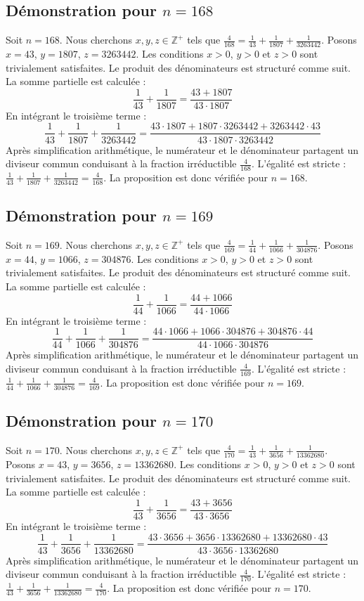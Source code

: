\documentclass[11pt,a4paper]{article}
\begin{document}
\subsection{Démonstration pour $n = 168$}
Soit $n = 168$. Nous cherchons $x, y, z \in \mathbb{Z}^{+}$ tels que $\frac{4}{168} = \frac{1}{43} + \frac{1}{1807} + \frac{1}{3263442}$.
Posons $x = 43$, $y = 1807$, $z = 3263442$.
Les conditions $x > 0$, $y > 0$ et $z > 0$ sont trivialement satisfaites.
Le produit des dénominateurs est structuré comme suit. La somme partielle est calculée :
$$ \frac{1}{43} + \frac{1}{1807} = \frac{43+1807}{43 \cdot 1807} $$
En intégrant le troisième terme :
$$ \frac{1}{43} + \frac{1}{1807} + \frac{1}{3263442} = \frac{43 \cdot 1807 + 1807 \cdot 3263442 + 3263442 \cdot 43}{43 \cdot 1807 \cdot 3263442} $$
Après simplification arithmétique, le numérateur et le dénominateur partagent un diviseur commun conduisant à la fraction irréductible $\frac{4}{168}$.
L'égalité est stricte : $\frac{1}{43} + \frac{1}{1807} + \frac{1}{3263442} = \frac{4}{168}$.
La proposition est donc vérifiée pour $n = 168$.
\subsection{Démonstration pour $n = 169$}
Soit $n = 169$. Nous cherchons $x, y, z \in \mathbb{Z}^{+}$ tels que $\frac{4}{169} = \frac{1}{44} + \frac{1}{1066} + \frac{1}{304876}$.
Posons $x = 44$, $y = 1066$, $z = 304876$.
Les conditions $x > 0$, $y > 0$ et $z > 0$ sont trivialement satisfaites.
Le produit des dénominateurs est structuré comme suit. La somme partielle est calculée :
$$ \frac{1}{44} + \frac{1}{1066} = \frac{44+1066}{44 \cdot 1066} $$
En intégrant le troisième terme :
$$ \frac{1}{44} + \frac{1}{1066} + \frac{1}{304876} = \frac{44 \cdot 1066 + 1066 \cdot 304876 + 304876 \cdot 44}{44 \cdot 1066 \cdot 304876} $$
Après simplification arithmétique, le numérateur et le dénominateur partagent un diviseur commun conduisant à la fraction irréductible $\frac{4}{169}$.
L'égalité est stricte : $\frac{1}{44} + \frac{1}{1066} + \frac{1}{304876} = \frac{4}{169}$.
La proposition est donc vérifiée pour $n = 169$.
\subsection{Démonstration pour $n = 170$}
Soit $n = 170$. Nous cherchons $x, y, z \in \mathbb{Z}^{+}$ tels que $\frac{4}{170} = \frac{1}{43} + \frac{1}{3656} + \frac{1}{13362680}$.
Posons $x = 43$, $y = 3656$, $z = 13362680$.
Les conditions $x > 0$, $y > 0$ et $z > 0$ sont trivialement satisfaites.
Le produit des dénominateurs est structuré comme suit. La somme partielle est calculée :
$$ \frac{1}{43} + \frac{1}{3656} = \frac{43+3656}{43 \cdot 3656} $$
En intégrant le troisième terme :
$$ \frac{1}{43} + \frac{1}{3656} + \frac{1}{13362680} = \frac{43 \cdot 3656 + 3656 \cdot 13362680 + 13362680 \cdot 43}{43 \cdot 3656 \cdot 13362680} $$
Après simplification arithmétique, le numérateur et le dénominateur partagent un diviseur commun conduisant à la fraction irréductible $\frac{4}{170}$.
L'égalité est stricte : $\frac{1}{43} + \frac{1}{3656} + \frac{1}{13362680} = \frac{4}{170}$.
La proposition est donc vérifiée pour $n = 170$.
\end{document}

